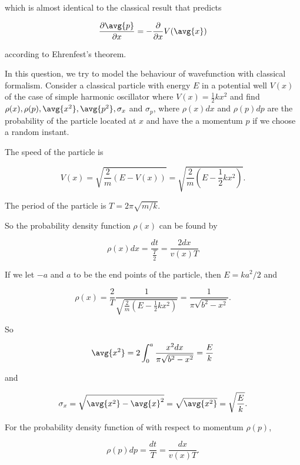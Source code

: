 \documentclass[a4paper,12pt]{report}
\begin{document}
{which is almost identical to the classical result that predicts 

\begin{equation}
  \frac{\partial \avg{p} }{\partial x} = -\frac{\partial }{\partial x} V(\avg{x} ) 
\end{equation}

according to Ehrenfest's theorem.}
	
{In this question, we try to model the behaviour of wavefunction with classical formalism. Consider a classical particle with energy \(E\) in a potential well \(V(x)\) of the case of simple harmonic oscillator where \(V(x) = \frac12 kx^2\) and find \(\rho(x),\rho(p), \avg{x^2}, \avg{p^2}, \sigma_x\) and \(\sigma_p\), where \(\rho(x)dx\) and \(\rho(p)dp\) are the probability of the particle located at \(x\) and have the a momentum \(p\) if we choose a random instant.}
{The speed of the particle is
	
\begin{equation}
  V(x) = \sqrt{\frac{2}{m} (E - V(x))} = \sqrt{\frac{2}{m} (E - \frac{1}{2} kx^2 )}.  
\end{equation}
		
The period of the particle is  \(T = 2\pi \sqrt{m /k}\).
		
So the probability density function \(\rho(x)\) can be found by
		
\begin{equation}
  \rho (x) dx = \frac{dt}{\frac{T}{2} } = \frac{2dx}{v(x)T}  
\end{equation}
		
If we let \(-a\) and \(a\) to be the end points of the particle, then \(E =  ka^2 /2\) and
		
\begin{equation}
  \rho (x) = \frac{2}{T} \frac{1}{\sqrt{\frac{2}{m} \left(E - \frac{1}{2} kx^2 \right)} } = \frac{1}{\pi \sqrt{b^2 -x^2 } }.  
\end{equation}

So 
		
\begin{equation}
  \avg{x^2 } = 2\int_{0}^{a} \frac{x^2 dx}{\pi \sqrt{b^2 -x^2 } } =  \frac{E}{k}    
\end{equation}

and 

\begin{equation}
  \sigma _{x} = \sqrt{\avg{x^2 } - \avg{x} ^2  } = \sqrt{\avg{x^2 } } = \sqrt{\frac{E}{k} }.   
\end{equation}

For the probability density function of with respect to momentum \(\rho(p)\), 

\begin{equation}
  \rho (p)dp = \frac{dt}{T}  = \frac{dx}{v(x)T}.
\end{equation}}
\end{document}
